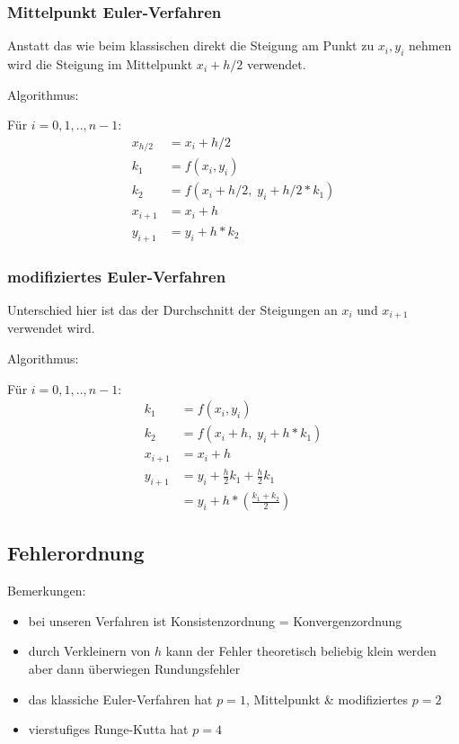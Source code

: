 \subsubsection{Mittelpunkt Euler-Verfahren}

Anstatt das wie beim klassischen direkt die Steigung am Punkt zu $x_i, y_i$ nehmen
wird die Steigung im Mittelpunkt $x_i + h/2$ verwendet.


\begingroup
\addtolength{\jot}{0.5em}
\large
Algorithmus:

Für $i = 0,1,..,n-1$:
\begin{align*}
	x_{h/2} & = x_i + h/2                        \\
	k_1     & = f(x_i, y_i)                      \\
	k_2     & = f(x_i + h/2, \; y_i + h/2 * k_1) \\
	x_{i+1} & = x_i + h                          \\
	y_{i+1} & = y_i + h * k_2
\end{align*}
\endgroup


\subsubsection{modifiziertes Euler-Verfahren}

Unterschied hier ist das der Durchschnitt der Steigungen an $x_i$ und $x_{i+1}$
verwendet wird.

\begingroup
\addtolength{\jot}{0.5em}
\large
Algorithmus:

Für $i = 0,1,..,n-1$:
\begin{align*}
	k_1     & = f(x_i, y_i)                                \\
	k_2     & = f(x_i + h, \; y_i + h * k_1)               \\
	x_{i+1} & = x_i + h                                    \\
	y_{i+1} & = y_i + \frac{h}{2} k_1 + \frac{h}{2} k_1    \\
	        & = y_i + h * \left(\frac{k_1 + k_2}{2}\right)
\end{align*}
\endgroup



\subsection{Fehlerordnung}

Bemerkungen:
\begin{itemize}
    \item bei unseren Verfahren ist Konsistenzordnung = Konvergenzordnung
    \item durch Verkleinern von $h$ kann der Fehler theoretisch beliebig klein
        werden aber dann überwiegen Rundungsfehler
    \item das klassiche Euler-Verfahren hat $p=1$, Mittelpunkt \& modifiziertes
        $p=2$
    \item vierstufiges Runge-Kutta hat $p=4$
\end{itemize}

